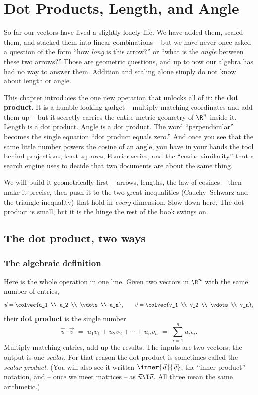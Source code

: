 \chapter{Dot Products, Length, and Angle}

So far our vectors have lived a slightly lonely life. We have added them, scaled
them, and stacked them into linear combinations -- but we have never once asked a
question of the form ``how \emph{long} is this arrow?'' or ``what is the
\emph{angle} between these two arrows?'' Those are geometric questions, and up to
now our algebra has had no way to answer them. Addition and scaling alone simply
do not know about length or angle.

This chapter introduces the one new operation that unlocks all of it: the
\textbf{dot product}. It is a humble-looking gadget -- multiply matching
coordinates and add them up -- but it secretly carries the entire metric geometry
of $\R^n$ inside it. Length is a dot product. Angle is a dot product. The word
``perpendicular'' becomes the single equation ``dot product equals zero.'' And
once you see that the same little number powers the cosine of an angle, you have
in your hands the tool behind projections, least squares, Fourier series, and the
``cosine similarity'' that a search engine uses to decide that two documents are
about the same thing.

We will build it geometrically first -- arrows, lengths, the law of cosines --
then make it precise, then push it to the two great inequalities (Cauchy--Schwarz
and the triangle inequality) that hold in \emph{every} dimension. Slow down here.
The dot product is small, but it is the hinge the rest of the book swings on.

\chapterline

\section{The dot product, two ways}

\subsection{The algebraic definition}

Here is the whole operation in one line. Given two vectors in $\R^n$ with the same
number of entries,
\[
  \vec{u} = \colvec{u_1 \\ u_2 \\ \vdots \\ u_n}, \qquad
  \vec{v} = \colvec{v_1 \\ v_2 \\ \vdots \\ v_n},
\]
their \textbf{dot product} is the single number
\[
  \vec{u}\cdot\vec{v} \;=\; u_1 v_1 + u_2 v_2 + \cdots + u_n v_n
  \;=\; \sum_{i=1}^{n} u_i v_i.
\]
Multiply matching entries, add up the results. The inputs are two vectors; the
output is one \emph{scalar}. For that reason the dot product is sometimes called
the \emph{scalar product}. (You will also see it written $\inner{\vec u}{\vec v}$,
the ``inner product'' notation, and -- once we meet matrices -- as $\vec u\T\vec v$.
All three mean the same arithmetic.)

